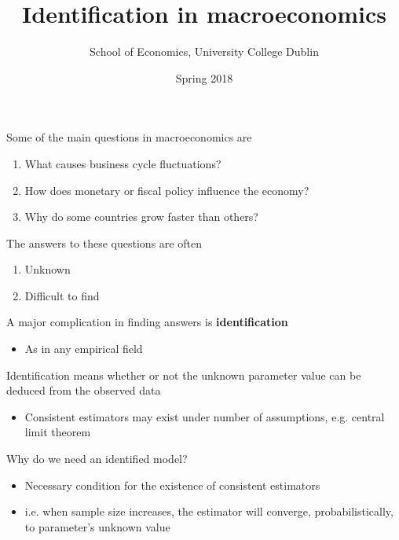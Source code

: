 \documentclass{beamer}
\title{Identification in macroeconomics}
\author{School of Economics, University College Dublin}
\date{Spring 2018}
\begin{document}
\begin{frame}
 \titlepage
\end{frame}

\begin{frame} 
  Some of the main questions in macroeconomics are
  \medskip
  \begin{enumerate}
    \item What causes business cycle fluctuations?
    \item How does monetary or fiscal policy influence the economy?
    \medskip
    \item Why do some countries grow faster than others?
  \end{enumerate}  
\end{frame}

\begin{frame}
  The answers to these questions are often   
  \begin{enumerate}
    \item Unknown
    \item Difficult to find
  \end{enumerate}
\end{frame}

\begin{frame}
  A major complication in finding answers is \textbf{identification}
  \begin{itemize}
    \item As in any empirical field
  \end{itemize}
  \medskip
  Identification means whether or not the unknown parameter value can be deduced from the observed data  
  \begin{itemize}
    \item Consistent estimators may exist under number of assumptions, e.g. central limit theorem
  \end{itemize}
\end{frame}

\begin{frame}
  Why do we need an identified model?  
  \begin{itemize}
    \item Necessary condition for the existence of consistent estimators
    \item i.e. when sample size increases, the estimator will converge, probabilistically, to parameter's unknown value
  \end{itemize}  
\end{frame}
\end{document}
